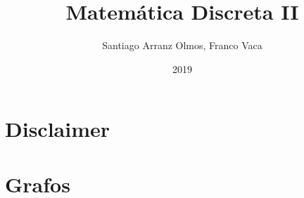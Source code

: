 \documentclass{article}
\title{Matemática Discreta II}
\author{Santiago Arranz Olmos, Franco Vaca}
\date{2019}
\theoremstyle{proposition}
\begin{document}
\maketitle
\pagebreak

\section*{Disclaimer}

\pagebreak

\tableofcontents
\pagebreak

%

\section{Grafos}


%

%

%

%

%
\end{document}
